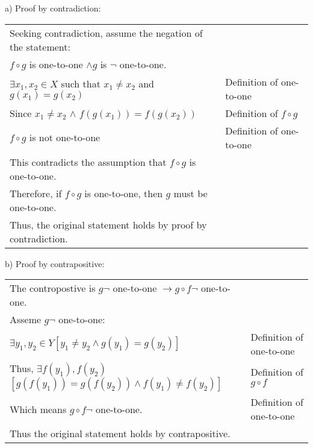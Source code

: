 \documentclass[12pt]{exam}
\begin{document}
\begin{solution}
	a) Proof by contradiction:\\
	\begin{tabular}{ll}
		Seeking contradiction, assume the negation of the statement:                                        \\
		$f \circ g$ is one-to-one $\land g$ is $\lnot$ one-to-one.                                          \\
		$\exists x_1, x_2 \in X$ such that $x_1 \neq x_2$ and $g(x_1) = g(x_2)$ & Definition of one-to-one  \\
		Since $x_1 \neq x_2$ $\land$ $f(g(x_1)) = f(g(x_2))$                    & Definition of $f \circ g$ \\
		$f \circ g$ is not one-to-one                                           & Definition of one-to-one  \\
		This contradicts the assumption that $f \circ g$ is one-to-one.                                     \\
		Therefore, if $f \circ g$ is one-to-one, then $g$ must be one-to-one.                               \\
		Thus, the original statement holds by proof by contradiction.                                       \\
	\end{tabular}
	b) Proof by contrapositive:\\
	\begin{tabular}{ll}
		The contropostive is $g\lnot$ one-to-one $\rightarrow g \circ f\lnot$ one-to-one.                           \\
		Asseme $g\lnot $ one-to-one:                                                                                \\
		$\exists y_1, y_2 \in Y [y_1 \neq y_2\land g(y_1) = g(y_2)]$                    & Definition of one-to-one  \\
		Thus, $\exists f(y_1), f(y_2)$$[g(f(y_1)) = g(f(y_2)) \land f(y_1)\neq f(y_2)]$ & Definition of $g \circ f$ \\
		Which means $g \circ f\lnot $ one-to-one.                                       & Definition of one-to-one  \\
		Thus the original statement holds by contrapositive.                                                        \\
	\end{tabular}

\end{solution}
\end{document}
